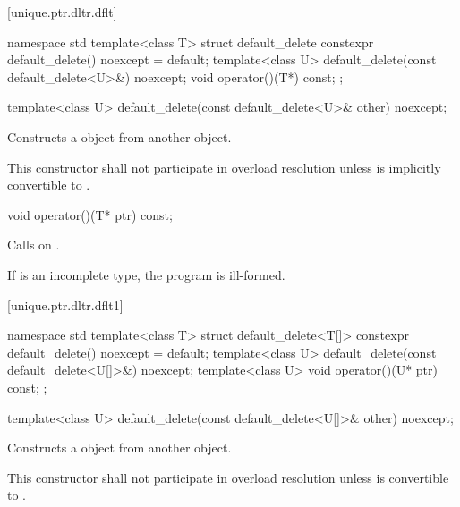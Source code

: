 [unique.ptr.dltr.dflt]{}

\begin{codeblock}
namespace std {
  template<class T> struct default_delete {
    constexpr default_delete() noexcept = default;
    template<class U> default_delete(const default_delete<U>&) noexcept;
    void operator()(T*) const;
  };
}
\end{codeblock}

%
\begin{itemdecl}
template<class U> default_delete(const default_delete<U>& other) noexcept;
\end{itemdecl}

\begin{itemdescr}
\pnum
\effects
Constructs a  object
from another  object.

\pnum
\remarks
This constructor shall not participate in overload resolution unless
 is implicitly convertible to .
\end{itemdescr}

%
\begin{itemdecl}
void operator()(T* ptr) const;
\end{itemdecl}

\begin{itemdescr}
\pnum
\effects
Calls  on .

\pnum
\remarks
If  is an incomplete type, the program is ill-formed.
\end{itemdescr}

[unique.ptr.dltr.dflt1]{}

\begin{codeblock}
namespace std {
  template<class T> struct default_delete<T[]> {
    constexpr default_delete() noexcept = default;
    template<class U> default_delete(const default_delete<U[]>&) noexcept;
    template<class U> void operator()(U* ptr) const;
  };
}
\end{codeblock}

\begin{itemdecl}
template<class U> default_delete(const default_delete<U[]>& other) noexcept;
\end{itemdecl}

\begin{itemdescr}
\pnum
\effects
Constructs a  object from another  object.

\pnum
\remarks
This constructor shall not participate in overload resolution unless  is
convertible to .
\end{itemdescr}

